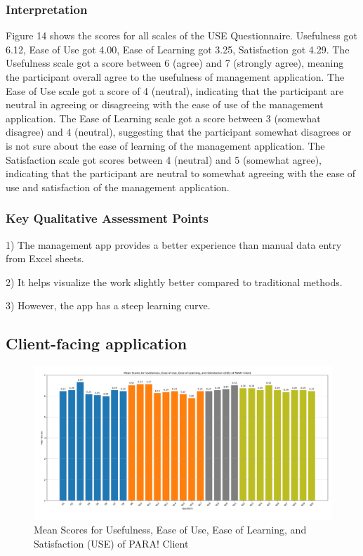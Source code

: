 \documentclass{icsthesis}
\begin{document}
\begin{mainmatter}
		\subsubsection{Interpretation}
		Figure 14 shows the scores for all scales of the USE Questionnaire.
		Usefulness got 6.12, Ease of Use got 4.00, Ease of Learning got 3.25, Satisfaction got 4.29.
		The Usefulness scale got a score between 6 (agree) and 7 (strongly agree), meaning the participant overall agree to the usefulness of management application.
		The Ease of Use scale got a score of 4 (neutral), indicating that the participant are neutral in agreeing or disagreeing with the ease of use of the management application.
		The Ease of Learning scale got a score between 3 (somewhat disagree) and 4 (neutral), suggesting that the participant somewhat disagrees or is not sure about the ease of learning  of the management application.
		The Satisfaction scale got scores between 4 (neutral) and 5 (somewhat agree), indicating that the participant are neutral to somewhat agreeing with the ease of use and satisfaction of the management application.
		\subsubsection{Key Qualitative Assessment Points}
		\begin{description}
			\item 1) The management app provides a better experience than manual data entry from Excel sheets.
			\item 2) It helps visualize the work slightly better compared to traditional methods.
			\item 3) However, the app has a steep learning curve.
		\end{description}
		
		\subsection{Client-facing application}
		\begin{figure}[h]
			\centering
				\includegraphics[scale=0.18]{./figures/client means.png}
			\caption{Mean Scores for Usefulness, Ease of Use, Ease of Learning, and Satisfaction (USE) of PARA! Client}
		\end{figure}
		

\end{mainmatter}
\end{document}
